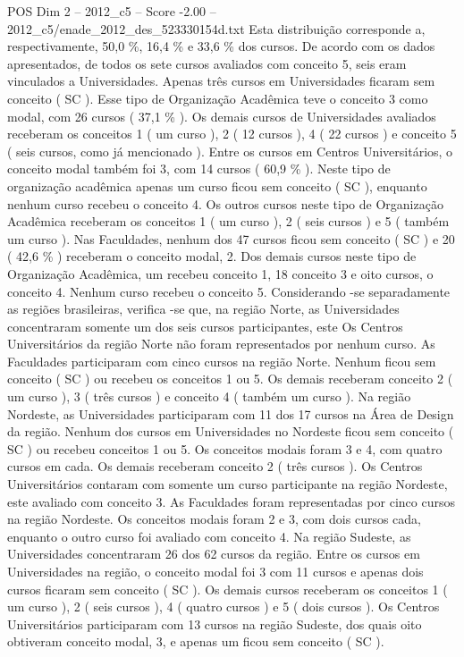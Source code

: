 \begin{textsample}{POS Dim 2 – 2012\_c5 – Score -2.00 – 2012\_c5/enade\_2012\_des\_523330154d.txt}
Esta distribuição corresponde a, respectivamente, 50,0 \%, 16,4 \% e 33,6 \% dos cursos.
De acordo com os dados apresentados, de todos os sete cursos avaliados com conceito 5, seis eram vinculados a Universidades.
Apenas três cursos em Universidades ficaram sem conceito ( SC ).
Esse tipo de Organização Acadêmica teve o conceito 3 como modal, com 26 cursos ( 37,1 \% ).
Os demais cursos de Universidades avaliados receberam os conceitos 1 ( um curso ), 2 ( 12 cursos ), 4 ( 22 cursos ) e conceito 5 ( seis cursos, como já mencionado ).
Entre os cursos em Centros Universitários, o conceito modal também foi 3, com 14 cursos ( 60,9 \% ).
Neste tipo de organização acadêmica apenas um curso ficou sem conceito ( SC ), enquanto nenhum curso recebeu o conceito 4.
Os outros cursos neste tipo de Organização Acadêmica receberam os conceitos 1 ( um curso ), 2 ( seis cursos ) e 5 ( também um curso ).
Nas Faculdades, nenhum dos 47 cursos ficou sem conceito ( SC ) e 20 ( 42,6 \% ) receberam o conceito modal, 2.
Dos demais cursos neste tipo de Organização Acadêmica, um recebeu conceito 1, 18 conceito 3 e oito cursos, o conceito 4.
Nenhum curso recebeu o conceito 5.
Considerando -se separadamente as regiões brasileiras, verifica -se que, na região Norte, as Universidades concentraram somente um dos seis cursos participantes, este Os Centros Universitários da região Norte não foram representados por nenhum curso.
As Faculdades participaram com cinco cursos na região Norte.
Nenhum ficou sem conceito ( SC ) ou recebeu os conceitos 1 ou 5.
Os demais receberam conceito 2 ( um curso ), 3 ( três cursos ) e conceito 4 ( também um curso ).
Na região Nordeste, as Universidades participaram com 11 dos 17 cursos na Área de Design da região.
Nenhum dos cursos em Universidades no Nordeste ficou sem conceito ( SC ) ou recebeu conceitos 1 ou 5.
Os conceitos modais foram 3 e 4, com quatro cursos em cada.
Os demais receberam conceito 2 ( três cursos ).
Os Centros Universitários contaram com somente um curso participante na região Nordeste, este avaliado com conceito 3.
As Faculdades foram representadas por cinco cursos na região Nordeste.
Os conceitos modais foram 2 e 3, com dois cursos cada, enquanto o outro curso foi avaliado com conceito 4.
Na região Sudeste, as Universidades concentraram 26 dos 62 cursos da região.
Entre os cursos em Universidades na região, o conceito modal foi 3 com 11 cursos e apenas dois cursos ficaram sem conceito ( SC ).
Os demais cursos receberam os conceitos 1 ( um curso ), 2 ( seis cursos ), 4 ( quatro cursos ) e 5 ( dois cursos ).
Os Centros Universitários participaram com 13 cursos na região Sudeste, dos quais oito obtiveram conceito modal, 3, e apenas um ficou sem conceito ( SC ).

\end{textsample}
